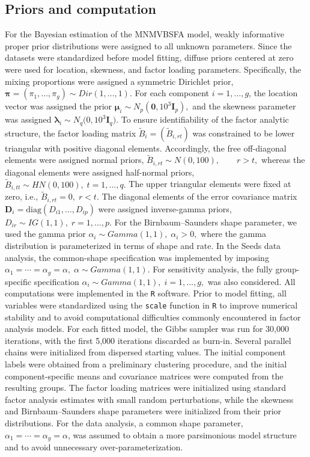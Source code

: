 \documentclass[twoside]{article}
\theoremstyle{definition}
\begin{document}
\subsection{Priors and computation}
\vspace{-0.5cm}
For the Bayesian estimation of the MNMVBSFA model, weakly informative proper prior distributions were assigned to all unknown parameters. Since the datasets were standardized before model fitting, diffuse priors centered at zero were used for location, skewness, and factor loading parameters. Specifically, the mixing proportions were assigned a symmetric Dirichlet prior,
$
\bm \pi=(\pi_1,\ldots,\pi_g)\sim Dir(1,\ldots,1).
$
For each component \(i=1,\ldots,g\), the location vector was assigned the prior
$
\bm \mu_i \sim N_p(\bm 0,10^3 \bm I_p),
$
and the skewness parameter was assigned
$
\bm \lambda_i \sim N_q\bm (0,10^3 \bm I_q).
$
To ensure identifiability of the factor analytic structure, the factor loading matrix
\(\tilde B_i=(\tilde B_{i,rt})\) was constrained to be lower triangular with positive diagonal elements. Accordingly, the free off-diagonal elements were assigned normal priors,
$
\tilde B_{i,rt} \sim N(0,100), \qquad r>t,
$
whereas the diagonal elements were assigned half-normal priors,
$
\tilde B_{i,tt} \sim HN(0,100), \; t=1,\ldots,q.
$
The upper triangular elements were fixed at zero, i.e.,
$
\tilde B_{i,rt}=0, \; r<t.
$
The diagonal elements of the error covariance matrix \(\bm D_i=\mathrm{diag}(D_{i1},\ldots,D_{ip})\) were assigned inverse-gamma priors,
$
D_{ir}\sim IG(1,1), \; r=1,\ldots,p.
$
For the Birnbaum--Saunders shape parameter, we used the gamma prior
$
\alpha_i \sim Gamma(1,1), \; \alpha_i>0,
$
where the gamma distribution is parameterized in terms of shape and rate. In the Seeds data analysis, the common-shape specification was implemented by imposing
$
\alpha_1=\cdots=\alpha_g=\alpha, \; \alpha \sim Gamma(1,1).
$
For sensitivity analysis, the fully group-specific specification
$
\alpha_i \sim Gamma(1,1), \; i=1,\ldots,g,
$
was also considered. All computations were implemented in the \texttt{R} software. Prior to model fitting, all variables were standardized using the \texttt{scale} function in \texttt{R} to improve numerical stability and to avoid computational difficulties commonly encountered in factor analysis models. For each fitted model, the Gibbs sampler was run for 30,000 iterations, with the first 5,000 iterations discarded as burn-in. Several parallel chains were initialized from dispersed starting values. The initial component labels were obtained from a preliminary clustering procedure, and the initial component-specific means and covariance matrices were computed from the resulting groups. The factor loading matrices were initialized using standard factor analysis estimates with small random perturbations, while the skewness and Birnbaum--Saunders shape parameters were initialized from their prior distributions. For the data analysis, a common shape parameter, \(\alpha_1=\cdots=\alpha_g=\alpha\), was assumed to obtain a more parsimonious model structure and to avoid unnecessary over-parameterization.
\end{document}
